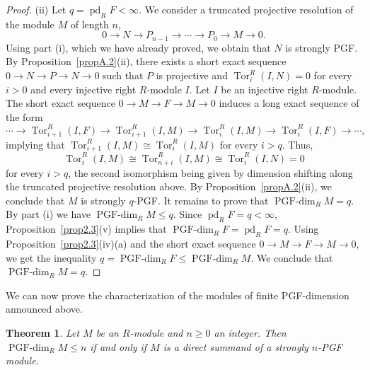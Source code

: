\documentclass[12pt]{amsart}
\newtheorem{theorem}{Theorem}[section]
\theoremstyle{remark}
\theoremstyle{definition}
\theoremstyle{plain}
\DeclareMathOperator{\pd}{pd}
\DeclareMathOperator{\Tor}{Tor}
\newcommand{\PGFdim}{\operatorname{PGF\text{-}dim}}
\begin{document}
\begin{proof}
(ii) Let $q=\pd_RF<\infty$. We consider a truncated projective resolution of the module $M$ of length $n$,
\[
0\rightarrow N\rightarrow P_{n-1}\rightarrow\cdots\rightarrow P_0\rightarrow M\rightarrow0 .
\]
Using part (i), which we have already proved, we obtain that $N$ is strongly PGF. By Proposition~\ref{propA.2}(ii), there exists a short exact sequence $0\rightarrow N\rightarrow P\rightarrow N\rightarrow0$ such that $P$ is projective and $\Tor^R_i(I,N)=0$ for every $i>0$ and every injective right $R$-module $I$. Let $I$ be an injective right $R$-module. The short exact sequence $0\rightarrow M\rightarrow F\rightarrow M\rightarrow0$ induces a long exact sequence of the form
\[
\cdots\rightarrow\Tor^R_{i+1}(I,F)\rightarrow\Tor^R_{i+1}(I,M)\rightarrow\Tor^R_i(I,M)\rightarrow\Tor^R_i(I,F)\rightarrow\cdots,
\]
implying that $\Tor^R_{i+1}(I,M)\cong\Tor^R_i(I,M)$ for every $i>q$. Thus,
\[
\Tor^R_i(I,M)\cong\Tor^R_{n+i}(I,M)\cong\Tor^R_i(I,N)=0
\]
for every $i>q$, the second isomorphism being given by dimension shifting along the truncated projective resolution above. By Proposition~\ref{propA.2}(ii), we conclude that $M$ is strongly $q$-PGF. It remains to prove that $\PGFdim_RM=q$. By part (i) we have $\PGFdim_RM\le q$. Since $\pd_RF=q<\infty$, Proposition~\ref{prop2.3}(v) implies that $\PGFdim_RF=\pd_RF=q$. Using Proposition~\ref{prop2.3}(iv)(a) and the short exact sequence $0\rightarrow M\rightarrow F\rightarrow M\rightarrow0$, we get the inequality $q=\PGFdim_RF\le\PGFdim_RM$. We conclude that $\PGFdim_RM=q$.
\end{proof}

We can now prove the characterization of the modules of finite PGF-dimension announced above.

\begin{theorem}\label{theoA.5}
Let $M$ be an $R$-module and $n\ge0$ an integer. Then $\PGFdim_RM\le n$ if and only if $M$ is a direct summand of a strongly $n$-PGF module.
\end{theorem}
\end{document}
